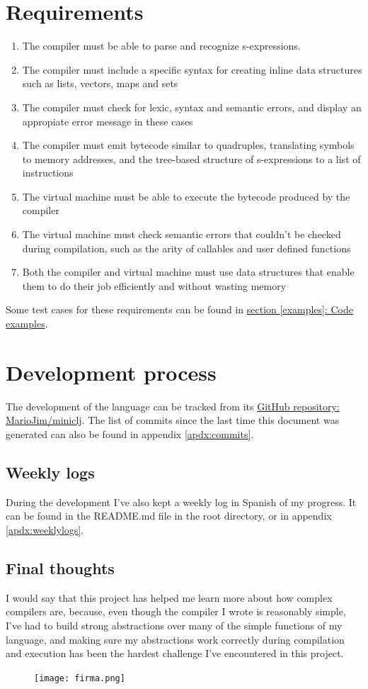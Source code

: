 \documentclass[11pt]{scrreprt}
\begin{document}
\section{Requirements}
\begin{enumerate}
  \item The compiler must be able to parse and recognize s-expressions.
  \item The compiler must include a specific syntax for creating inline data structures such as lists, vectors, maps and sets
  \item The compiler must check for lexic, syntax and semantic errors, and display an appropiate error message in these cases
  \item The compiler must emit bytecode similar to quadruples, translating symbols to memory addresses, and the tree-based structure of s-expressions to a list of instructions
  \item The virtual machine must be able to execute the bytecode produced by the compiler
  \item The virtual machine must check semantic errors that couldn't be checked during compilation, such as the arity of callables and user defined functions
  \item Both the compiler and virtual machine must use data structures that enable them to do their job efficiently and without wasting memory
\end{enumerate}

Some test cases for these requirements can be found in \hyperref[examples]{section \ref{examples}: Code examples}.

\section{Development process}
The development of the language can be tracked from its \href{https://github.com/MarioJim/miniclj}{GitHub repository: MarioJim/miniclj}. The list of commits since the last time this document was generated can also be found in appendix \ref{apdx:commits}.

\subsection{Weekly logs}
During the development I've also kept a weekly log in Spanish of my progress. It can be found in the README.md file in the root directory, or in appendix \ref{apdx:weeklylogs}.

\subsection{Final thoughts}
I would say that this project has helped me learn more about how complex compilers are, because, even though the compiler I wrote is reasonably simple, I've had to build strong abstractions over many of the simple functions of my language, and making sure my abstractions work correctly during compilation and execution has been the hardest challenge I've encountered in this project.
\begin{figure}[H]
  \texttt{[image: firma.png]}
\end{figure}
\end{document}
